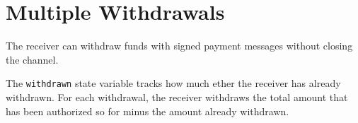 \section{Multiple Withdrawals}\label{sec:multiple-withdrawals}
The receiver can withdraw funds with signed payment messages without closing the channel.



The \texttt{withdrawn} state variable tracks how much ether the receiver has already withdrawn.
For each withdrawal, the receiver withdraws the total amount that has been authorized so for minus the amount already
withdrawn.